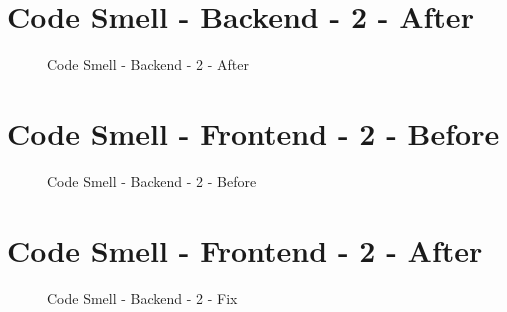 \section{Code Smell - Backend - 2 - After} \label{a.4.backend.codesmell2.after}
\begin{figure}[h]
	\centering
	\caption{Code Smell - Backend - 2 - After}
	\label{a.1.aggregate}
\end{figure}

\newpage

\section{Code Smell - Frontend - 2 - Before} \label{a.4.frontend.codesmell1.before}
\begin{figure}[h]
	\centering
	\caption{Code Smell - Backend - 2 - Before}
	\label{a.1.aggregate}
\end{figure}

\section{Code Smell - Frontend - 2 - After} \label{a.4.frontend.codesmell1.after}
\begin{figure}[h]
	\centering
	\caption{Code Smell - Backend - 2 - Fix}
	\label{a.1.aggregate}
\end{figure}
